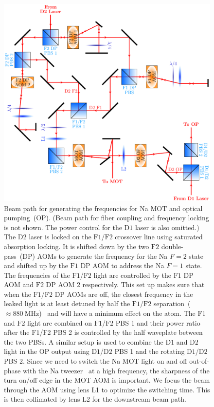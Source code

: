 \begin{figure}
  \centering
  \includegraphics[width=\textwidth]{figures/loading_na_res_beampath.pdf}
  \caption[Beam path for Na $\mathrm{D1}$ and $\mathrm{D2}$ light.]{
    Beam path for generating the frequencies for Na MOT and optical pumping~(OP).
    (Beam path for fiber coupling and frequency locking is not shown.
    The power control for the $\mathrm{D1}$ laser is also omitted.)
    The $\mathrm{D2}$ laser is locked on the $\mathrm{F1}$/$\mathrm{F2}$ crossover line using
    saturated absorption locking.
    It is shifted down by the two $\mathrm{F2}$ double-pass~(DP) AOMs to generate the frequency
    for the Na $F=2$ state and shifted up by the $\mathrm{F1}$ DP AOM
    to address the Na $F=1$ state.
    The frequencies of the $\mathrm{F1}$/$\mathrm{F2}$ light are controlled
    by the $\mathrm{F1}$ DP AOM and $\mathrm{F2}$ DP AOM 2 respectively.
    This set up makes sure that when the $\mathrm{F1}$/$\mathrm{F2}$ DP AOMs are off,
    the closest frequency in the leaked light is at least detuned
    by half the $\mathrm{F1}$/$\mathrm{F2}$
    separation~($\approx\!880~\mathrm{MHz}$)~\cite{steck_sodium_2019}
    and will have a minimum effect on the atom.
    The $\mathrm{F1}$ and $\mathrm{F2}$ light are combined
    on $\mathrm{F1}$/$\mathrm{F2}$ PBS 1 and their power ratio after the
    $\mathrm{F1}$/$\mathrm{F2}$ PBS 2 is controlled by the half waveplate between the two PBSs.
    A similar setup is used to combine the $\mathrm{D1}$ and $\mathrm{D2}$ light
    in the OP output using $\mathrm{D1}$/$\mathrm{D2}$ PBS 1
    and the rotating $\mathrm{D1}$/$\mathrm{D2}$ PBS 2.
    Since we need to switch the Na MOT light on and off out-of-phase
    with the Na tweezer~\cite{hutzler_eliminating_2017} at a high frequency,
    the sharpness of the turn on/off edge in the MOT AOM is important.
    We focus the beam through the AOM using lens L1 to optimize the switching time.
    This is then collimated by lens L2 for the downstream beam path.
    \label{fig:loading:free-space:na-res-beampath}}
\end{figure}

